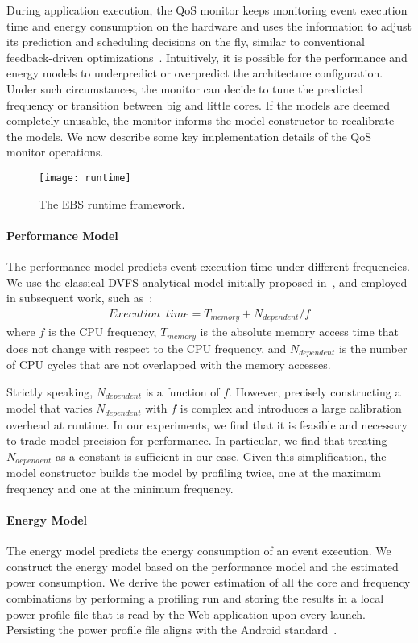 During application execution, the QoS monitor keeps monitoring event execution time and energy consumption on the hardware and uses the information to adjust its prediction and scheduling decisions on the fly, similar to conventional feedback-driven optimizations~\cite{FDO}. Intuitively, it is possible for the performance and energy models to underpredict or overpredict the architecture configuration. Under such circumstances, the monitor can decide to tune the predicted frequency or transition between big and little cores. If the models are deemed completely unusable, the monitor informs the model constructor to recalibrate the models. We now describe some key implementation details of the QoS monitor operations.

\begin{figure}[t]
  \centering
  \texttt{[image: runtime]}
  \caption{\small{The EBS runtime framework.}}
  \label{fig:runtime}
\end{figure}

\paragraph{Performance Model} The performance model predicts event execution time under different frequencies. We use the classical DVFS analytical model initially proposed in~\cite{dvfs_model}, and employed in subsequent work, such as~\cite{dvfs_power}:
\begin{align*}
Execution\,\,\,time = T_{memory} + N_{dependent}/f
\end{align*}
where $f$ is the CPU frequency, $T_{memory}$ is the absolute memory access time that does not change with respect to the CPU frequency, and $N_{dependent}$ is the number of CPU cycles that are not overlapped with the memory accesses.

Strictly speaking, $N_{dependent}$ is a function of $f$. However, precisely constructing a model that varies $N_{dependent}$ with $f$ is complex and introduces a large calibration overhead at runtime. In our experiments, we find that it is feasible and necessary to trade model precision for performance. In particular, we find that treating $N_{dependent}$ as a constant is sufficient in our case. Given this simplification, the model constructor builds the model by profiling twice, one at the maximum frequency and one at the minimum frequency.

\paragraph{Energy Model} The energy model predicts the energy consumption of an event execution. We construct the energy model based on the performance model and the estimated power consumption. We derive the power estimation of all the core and frequency combinations by performing a profiling run and storing the results in a local power profile file that is read by the Web application upon every launch. Persisting the power profile file aligns with the Android standard~\cite{powerxml}. 

